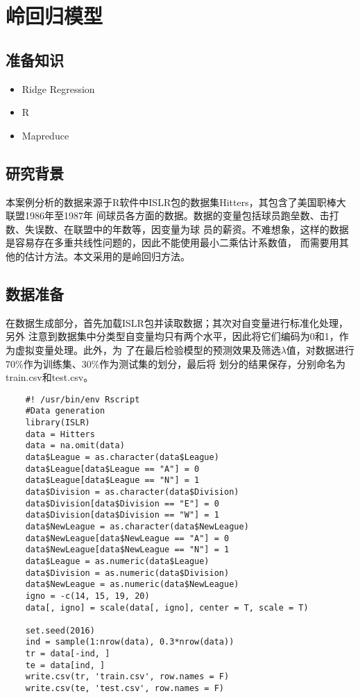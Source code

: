\section{岭回归模型}\label{ux5b9eux4f8bux5206ux6790ux5229ux7528mapreduceux8ba1ux7b97ux5cadux56deux5f52ux6a21ux578bux7cfbux6570}

\subsection{准备知识}\label{ux51c6ux5907ux77e5ux8bc6}

\begin{itemize}
\itemsep1pt\parskip0pt
\item
  Ridge Regression
\item
  R
\item
  Mapreduce
\end{itemize}

\subsection{研究背景}\label{ux7814ux7a76ux80ccux666f}

本案例分析的数据来源于R软件中ISLR包的数据集Hitters，其包含了美国职棒大联盟1986年至1987年
间球员各方面的数据。数据的变量包括球员跑垒数、击打数、失误数、在联盟中的年数等，因变量为球
员的薪资。不难想象，这样的数据是容易存在多重共线性问题的，因此不能使用最小二乘估计系数值，
而需要用其他的估计方法。本文采用的是岭回归方法。


\subsection{数据准备}\label{ux6570ux636eux51c6ux5907}

在数据生成部分，首先加载ISLR包并读取数据；其次对自变量进行标准化处理，另外
注意到数据集中分类型自变量均只有两个水平，因此将它们编码为0和1，作为虚拟变量处理。此外，为
了在最后检验模型的预测效果及筛选$\lambda$值，对数据进行70\%作为训练集、30\%作为测试集的划分，最后将
划分的结果保存，分别命名为train.csv和test.csv。

\begin{lstlisting}
	#! /usr/bin/env Rscript
	#Data generation
	library(ISLR)
	data = Hitters
	data = na.omit(data)
	data$League = as.character(data$League)
	data$League[data$League == "A"] = 0
	data$League[data$League == "N"] = 1
	data$Division = as.character(data$Division)
	data$Division[data$Division == "E"] = 0
	data$Division[data$Division == "W"] = 1
	data$NewLeague = as.character(data$NewLeague)
	data$NewLeague[data$NewLeague == "A"] = 0
	data$NewLeague[data$NewLeague == "N"] = 1
	data$League = as.numeric(data$League)
	data$Division = as.numeric(data$Division)
	data$NewLeague = as.numeric(data$NewLeague)
	igno = -c(14, 15, 19, 20)
	data[, igno] = scale(data[, igno], center = T, scale = T)

	set.seed(2016)
	ind = sample(1:nrow(data), 0.3*nrow(data))
	tr = data[-ind, ]
	te = data[ind, ]
	write.csv(tr, 'train.csv', row.names = F)
	write.csv(te, 'test.csv', row.names = F)
\end{lstlisting}

